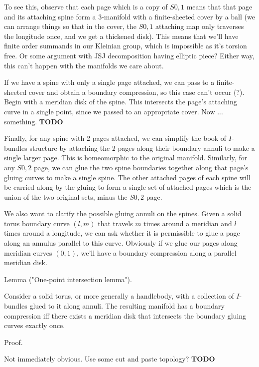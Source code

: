 \documentclass[12pt]{amsart}
\theoremstyle{definition}
\theoremstyle{remark}
\begin{document}
To see this, observe that each page which is a copy of $S0,1$ means that that
page and its attaching spine form a 3-manifold with a finite-sheeted cover by
a ball (we can arrange things so that in the cover, the $S0,1$ attaching map
only traverses the longitude once, and we get a thickened disk). This means
that we'll have finite order summands in our Kleinian group, which is
impossible as it's torsion free. Or some argument with JSJ decomposition having
elliptic piece? Either way, this can't happen with the manifolds we care about.

If we have a spine with only a single page attached, we can pass to
a finite-sheeted cover and obtain a boundary compression, so this case can't
occur (?). Begin with a meridian disk of the spine.  This intersects the page's
attaching curve in a single point, since we passed to an appropriate cover. Now
... something. {\bf TODO} %

Finally, for any spine with 2 pages attached, we can simplify the book of
$I$-bundles structure by attaching the 2 pages along their boundary annuli to
make a single larger page. This is homeomorphic to the original manifold.
Similarly, for any $S0,2$ page, we can glue the two spine boundaries together
along that page's gluing curves to make a single spine. The other attached
pages of each spine will be carried along by the gluing to form a single set of
attached pages which is the union of the two original sets, minus the $S0,2$
page.

We also want to clarify the possible gluing annuli on the spines. Given a solid
torus boundary curve $(l,m)$ that travels $m$ times around a meridian and $l$
times around a longitude, we can ask whether it is permissible to glue a page
along an annulus parallel to this curve. Obviously if we glue our pages along
meridian curves $(0,1)$, we'll have a boundary compression along a parallel
meridian disk.


Lemma ("One-point intersection lemma").

Consider a solid torus, or more generally a handlebody, with a collection of
$I$-bundles glued to it along annuli. The resulting manifold has a boundary
compression iff there exists a meridian disk that intersects the boundary
gluing curves exactly once.

Proof.

Not immediately obvious. Use some cut and paste topology? {\bf TODO} %
\end{document}
